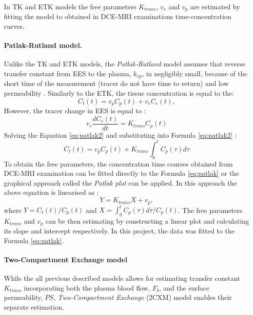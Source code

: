 In TK and ETK models the free parameters $K_{trans}$, $v_e$ and $v_p$ are estimated by fitting the model to obtained in DCE-MRI examinations time-concentration curves.  
\paragraph{Patlak-Rutland model.}
Unlike the TK and ETK models, the \textit{Patlak-Rutland} model \cite{patlak1983graphical} assumes that reverse transfer constant from EES to the plasma, $k_{ep}$, in negligibly small, because of the short time of the measurement (tracer do not have time to return) and low permeability \cite{khalifa2014models}. 
Similarly to the ETK, the tissue concentration is equal to the:
\begin{equation}
C_t(t) = v_pC_p(t) + v_eC_e(t),
\label{eq:patlak1}
\end{equation}
However, the tracer change in EES is equal to \cite{thesis,patlak1983graphical}: 
\begin{equation}
	\label{eq:patlak2}
	v_e\frac{dC_{e}(t)}{dt} = K_{trans}C_p(t)
\end{equation}
Solving the Equation \ref{eq:patlak2} and substituting into Formula \ref{eq:patlak2} \cite{khalifa2014models, patlak1983graphical}: 
\begin{equation}
	\label{eq:patlak}
	C_{t}(t) =v_pC_p(t) + K_{trans}\int_{0}^{t}C_p(\tau)d\tau  
\end{equation}
To obtain the free parameters, the concentration time courses obtained from DCE-MRI examination can be fitted directly to the Formula \ref{eq:patlak} or the graphical approach called the \textit{Patlak plot} can be applied. In this approach the above equation is linearised as \cite{khalifa2014models, patlak1983graphical}:  
\begin{equation}
	\label{eq:patlak_lin}
	Y = K_{trans}X +v_p,  
\end{equation}
where $Y=C_t(t)/C_p(t)$ and $X=\int_{0}^{t}C_p(\tau)d\tau/C_p(t)$. The free parameters $K_{trans}$ and $v_p$ can be then estimating by constructing a linear plot and calculating its slope and intercept respectively.
In this project, the data was fitted to the Formula \ref{eq:patlak}. 
\newpage
\paragraph{Two-Compartment Exchange model}While the all previous described models allows for estimating transfer constant $K_{trans}$ incorporating both the plasma blood flow, $F_b$, and the surface permeability, $PS$, \textit{Two-Compartment Exchange} (2CXM) model enables their separate estimation. 

